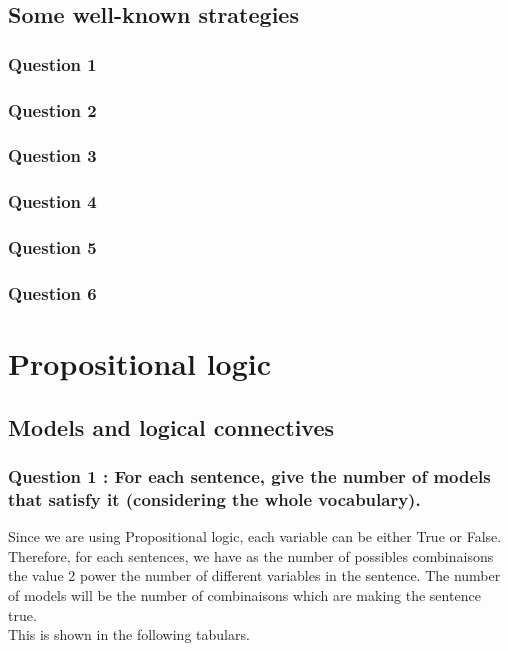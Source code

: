 \documentclass[a4paper,10pt]{article}
\begin{document}
\subsection{Some well-known strategies}
\subsubsection{Question 1}
\subsubsection{Question 2}
\subsubsection{Question 3}
\subsubsection{Question 4}
\subsubsection{Question 5}
\subsubsection{Question 6}



	
\newpage
	
	
	

\section{Propositional logic}
\subsection*{Models and logical connectives}

\subsubsection*{Question 1 : For each sentence, give the number of models that satisfy it (considering the
whole vocabulary).\\}

Since we are using Propositional logic, each variable can be either True or False. Therefore, for each sentences, we have as the number of possibles combinaisons the value 2 power the number of different variables in the sentence. The number of models will be the number of combinaisons which are making the sentence true. \\
This is shown in the following tabulars. \\
\end{document}
